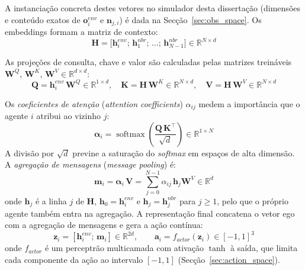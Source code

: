 \documentclass[12pt,reqno, twoside]{amsbook}
\theoremstyle{plain}
\numberwithin{equation}{chapter}
\numberwithin{section}{chapter}
\numberwithin{table}{chapter}
\numberwithin{figure}{chapter}
\begin{document}
A instanciação concreta destes vetores no simulador desta dissertação (dimensões e conteúdo exatos de $\mathbf{o}_i^{env}$ e $\mathbf{n}_{j,i}$) é dada na Secção~\ref{sec:obs_space}. Os embeddings formam a matriz de contexto:
\begin{equation}
    \mathbf{H} = \bigl[\mathbf{h}_i^{env};\, \mathbf{h}_1^{nbr};\, \ldots;\, \mathbf{h}_{N-1}^{nbr}\bigr] \in \mathbb{R}^{N \times d}
\end{equation}

As projeções de consulta, chave e valor são calculadas pelas matrizes treináveis $\mathbf{W}^Q$, $\mathbf{W}^K$, $\mathbf{W}^V \in \mathbb{R}^{d \times d}$:
\begin{equation}
    \mathbf{Q} = \mathbf{h}_i^{env}\,\mathbf{W}^Q \in \mathbb{R}^{1 \times d}, \quad
    \mathbf{K} = \mathbf{H}\,\mathbf{W}^K \in \mathbb{R}^{N \times d}, \quad
    \mathbf{V} = \mathbf{H}\,\mathbf{W}^V \in \mathbb{R}^{N \times d}
    \label{eq:qkv}
\end{equation}

Os \emph{coeficientes de atenção} (\textit{attention coefficients}) $\alpha_{ij}$ medem a importância que o agente $i$ atribui ao vizinho $j$:
\begin{equation}
    \boldsymbol{\alpha}_{i} = \operatorname{softmax}\!\left(\frac{\mathbf{Q}\,\mathbf{K}^\top}{\sqrt{d}}\right) \in \mathbb{R}^{1 \times N}
    \label{eq:attention_scores}
\end{equation}
A divisão por $\sqrt{d}$ previne a saturação do \textit{softmax} em espaços de alta dimensão. A \emph{agregação de mensagens} (\textit{message pooling}) é:
\begin{equation}
    \mathbf{m}_i = \boldsymbol{\alpha}_{i}\,\mathbf{V} = \sum_{j=0}^{N-1} \alpha_{ij}\,\mathbf{h}_j\mathbf{W}^V \in \mathbb{R}^d
    \label{eq:msg_pool}
\end{equation}
onde $\mathbf{h}_j$ é a linha $j$ de $\mathbf{H}$, $\mathbf{h}_0 = \mathbf{h}_i^{env}$ e $\mathbf{h}_j = \mathbf{h}_j^{nbr}$ para $j \geq 1$, pelo que o próprio agente também entra na agregação.
A representação final concatena o vetor ego com a agregação de mensagens e gera a ação contínua:
\begin{equation}
    \mathbf{z}_i = [\mathbf{h}_i^{env};\, \mathbf{m}_i] \in \mathbb{R}^{2d}, \qquad \mathbf{a}_i = f_{actor}(\mathbf{z}_i) \in [-1,1]^3
    \label{eq:gat_final}
\end{equation}
onde $f_{actor}$ é um perceptrão multicamada com ativação $\tanh$ à saída, que limita cada componente da ação ao intervalo $[-1,1]$ (Secção~\ref{sec:action_space}).
\end{document}
